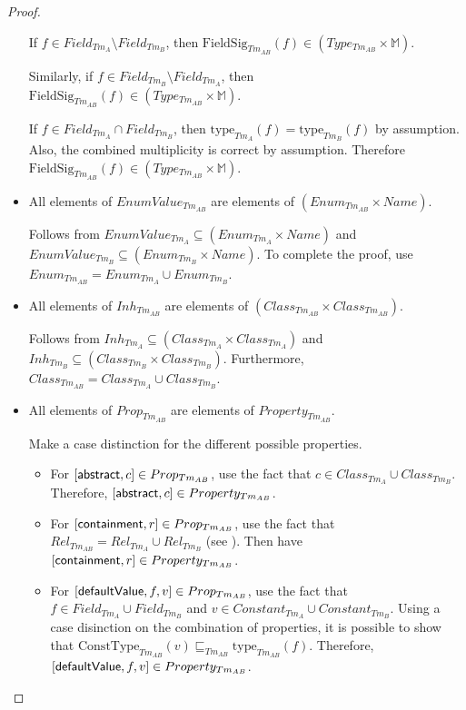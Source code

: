 \begin{proof}
\begin{itemize}
    If $f \in Field_{Tm_A} \setminus Field_{Tm_B}$, then $\mathrm{FieldSig}_{Tm_{AB}}(f) \in (Type_{Tm_{AB}} \times \mathbb{M})$.
    
    Similarly, if $f \in Field_{Tm_B} \setminus Field_{Tm_A}$, then $\mathrm{FieldSig}_{Tm_{AB}}(f) \in (Type_{Tm_{AB}} \times \mathbb{M})$. 
    
    If $f \in Field_{Tm_A} \cap Field_{Tm_B}$, then $\mathrm{type}_{Tm_A}(f) = \mathrm{type}_{Tm_B}(f)$ by assumption. Also, the combined multiplicity is correct by assumption. Therefore $\mathrm{FieldSig}_{Tm_{AB}}(f) \in (Type_{Tm_{AB}} \times \mathbb{M})$.
    
    
    \item All elements of $EnumValue_{Tm_{AB}}$ are elements of $(Enum_{Tm_{AB}} \times Name)$.
    
    Follows from $EnumValue_{Tm_A} \subseteq (Enum_{Tm_A} \times Name)$ and $EnumValue_{Tm_B} \subseteq (Enum_{Tm_B} \times Name)$. To complete the proof, use $Enum_{Tm_{AB}} = Enum_{Tm_A} \cup Enum_{Tm_B}$.
    
    
    \item All elements of $Inh_{Tm_{AB}}$ are elements of $(Class_{Tm_{AB}} \times Class_{Tm_{AB}})$.
    
    Follows from $Inh_{Tm_A} \subseteq (Class_{Tm_A} \times Class_{Tm_A})$ and $Inh_{Tm_B} \subseteq (Class_{Tm_B} \times Class_{Tm_B})$. Furthermore, $Class_{Tm_{AB}} = Class_{Tm_A} \cup Class_{Tm_B}$.
    
    
    \item All elements of $Prop_{Tm_{AB}}$ are elements of $Property_{Tm_{AB}}$.
    
    Make a case distinction for the different possible properties.
    \begin{itemize}
        \item For $[ \mathsf{abstract}, c ] \in Prop_{Tm_{AB}}$, use the fact that $c \in Class_{Tm_A} \cup Class_{Tm_B}$. Therefore, $[ \mathsf{abstract}, c ] \in Property_{Tm_{AB}}$.
        
        \item For $[ \mathsf{containment}, r ] \in Prop_{Tm_{AB}}$, use the fact that $Rel_{Tm_{AB}} = Rel_{Tm_A} \cup Rel_{Tm_B}$ (see ). Then have $[ \mathsf{containment}, r ] \in Property_{Tm_{AB}}$.
        
        \item For $[ \mathsf{defaultValue}, f, v ] \in Prop_{Tm_{AB}}$, use the fact that $f \in Field_{Tm_A} \cup Field_{Tm_B}$ and $v \in Constant_{Tm_A} \cup Constant_{Tm_B}$. Using a case disinction on the combination of properties, it is possible to show that $\mathrm{ConstType}_{Tm_{AB}}(v) \sqsubseteq_{Tm_{AB}} \mathrm{type}_{Tm_{AB}}(f)$. Therefore, $[ \mathsf{defaultValue}, f, v ] \in Property_{Tm_{AB}}$.
        

\end{itemize}
\end{itemize}
\end{proof}
